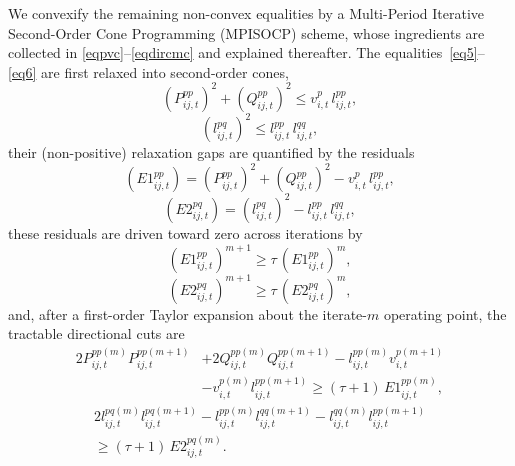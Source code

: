 We convexify the remaining non-convex equalities by a Multi-Period
Iterative Second-Order Cone Programming (MPISOCP) scheme, whose
ingredients are collected in \eqref{eqpvc}--\eqref{eqdircmc} and
explained thereafter. The equalities~\eqref{eq5}--\eqref{eq6} are first
relaxed into second-order cones,
\begin{equation}\label{eqpvc}
\left( P_{ij,t}^{pp} \right)^2 + \left( Q_{ij,t}^{pp} \right)^2
\leq v_{i,t}^p \, l_{ij,t}^{pp},
\end{equation}
\begin{equation}\label{eqcmc}
\left( l_{ij,t}^{pq} \right)^2 \leq l_{ij,t}^{pp} \, l_{ij,t}^{qq},
\end{equation}
their (non-positive) relaxation gaps are quantified by the residuals
\begin{equation}\label{erroreqpvc}
\left( E1_{ij,t}^{pp} \right) = \left( P_{ij,t}^{pp} \right)^2 + \left( Q_{ij,t}^{pp} \right)^2
- v_{i,t}^p \, l_{ij,t}^{pp},
\end{equation}
\begin{equation}\label{erroreqcmc}
\left( E2_{ij,t}^{pq} \right) = \left( l_{ij,t}^{pq} \right)^2 - l_{ij,t}^{pp} \, l_{ij,t}^{qq},
\end{equation}
these residuals are driven toward zero across iterations by
\begin{equation}\label{erroreqpvcred}
(E1_{ij,t}^{pp})^{m+1} \geq \tau\, (E1_{ij,t}^{pp})^{m},
\end{equation}
\begin{equation}\label{erroreqcmcred}
(E2_{ij,t}^{pq})^{m+1} \geq \tau\, (E2_{ij,t}^{pq})^{m},
\end{equation}
and, after a first-order Taylor expansion about the iterate-$m$
operating point, the tractable directional cuts are
\begin{equation}\label{eqdirpvc}
\begin{split}
2P_{ij,t}^{pp(m)} P_{ij,t}^{pp(m+1)}
&+ 2Q_{ij,t}^{pp(m)} Q_{ij,t}^{pp(m+1)}
- l_{ij,t}^{pp(m)} v_{i,t}^{p(m+1)} \\&
- v_{i,t}^{p(m)} l_{ij,t}^{pp(m+1)}
\geq (\tau + 1)\, E1_{ij,t}^{pp(m)},
\end{split}
\end{equation}
\begin{equation}\label{eqdircmc}
\begin{split}
2l_{ij,t}^{pq(m)}  l_{ij,t}^{pq(m+1)}
- l_{ij,t}^{pp(m)}  l_{ij,t}^{qq(m+1)}
- l_{ij,t}^{qq(m)}  l_{ij,t}^{pp(m+1)} \\
\geq (\tau + 1)\, E2_{ij,t}^{pq(m)}.
\end{split}
\end{equation}

